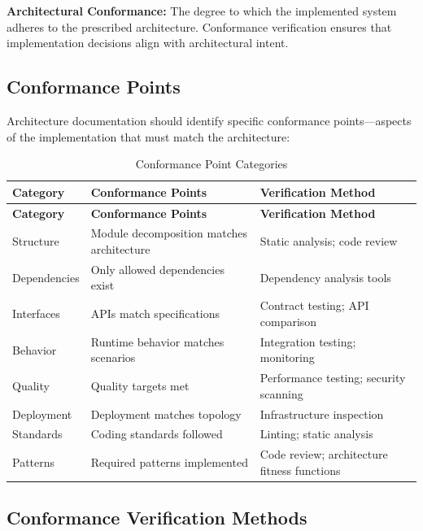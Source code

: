 \documentclass[11pt]{article}
\begin{document}
\begin{definition}
\textbf{Architectural Conformance:} The degree to which the implemented system adheres to the prescribed architecture. Conformance verification ensures that implementation decisions align with architectural intent.
\end{definition}

\subsection{Conformance Points}

Architecture documentation should identify specific conformance points---aspects of the implementation that must match the architecture:

\begin{longtable}{@{}L{3cm} L{4cm} L{5.5cm}@{}}
\caption{Conformance Point Categories} \\
\toprule
\textbf{Category} & \textbf{Conformance Points} & \textbf{Verification Method} \\
\midrule
\endfirsthead
\toprule
\textbf{Category} & \textbf{Conformance Points} & \textbf{Verification Method} \\
\midrule
\endhead
\bottomrule
\endlastfoot
Structure & Module decomposition matches architecture & Static analysis; code review \\
Dependencies & Only allowed dependencies exist & Dependency analysis tools \\
Interfaces & APIs match specifications & Contract testing; API comparison \\
Behavior & Runtime behavior matches scenarios & Integration testing; monitoring \\
Quality & Quality targets met & Performance testing; security scanning \\
Deployment & Deployment matches topology & Infrastructure inspection \\
Standards & Coding standards followed & Linting; static analysis \\
Patterns & Required patterns implemented & Code review; architecture fitness functions \\
\end{longtable}

\subsection{Conformance Verification Methods}
\end{document}
